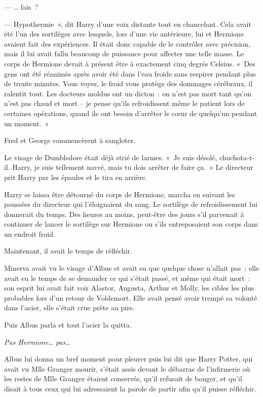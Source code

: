 --- … fais~?

--- Hypothermie~», dit Harry d'une voix distante tout en chancelant. Cela avait été l'un des sortilèges avec lesquels, lors d'une vie antérieure, lui et Hermione avaient fait des expériences. Il était donc capable de le contrôler avec précision, mais il lui avait fallu beaucoup de puissance pour affecter une telle masse. Le corps de Hermione devait à présent être à exactement cinq degrés Celsius. «~Des gens ont été réanimés après avoir été dans l'eau froide sans respirer pendant plus de trente minutes. Vous voyez, le froid vous protège des dommages cérébraux, il ralentit tout. Les docteurs moldus ont un dicton~: on n'est pas mort tant qu'on n'est pas chaud et mort -- je pense qu'ils refroidissent même le patient lors de certaines opérations, quand ils ont besoin d'arrêter le cœur de quelqu'un pendant un moment.~»

Fred et George commencèrent à sangloter.

Le visage de Dumbledore était déjà strié de larmes. «~Je suis désolé, chuchota-t-il. Harry, je suis tellement navré, mais tu dois arrêter de faire ça.~» Le directeur prit Harry par les épaules et le tira en arrière.

Harry se laissa être détourné du corps de Hermione, marcha en suivant les poussées du directeur qui l'éloignaient du sang. Le sortilège de refroidissement lui donnerait du temps. Des heures au moins, peut-être des jours s'il parvenait à continuer de lancer le sortilège sur Hermione ou s'ils entreposaient son corps dans un endroit froid.

Maintenant, il avait le temps de réfléchir.

\later

Minerva avait vu le visage d'Albus et avait su que quelque chose n'allait pas~; elle avait eu le temps de se demander ce qui s'était passé, et même qui était mort~: son esprit lui avait fait voir Alastor, Augusta, Arthur et Molly, les cibles les plus probables lors d'un retour de Voldemort. Elle avait pensé avoir trempé sa volonté dans l'acier, elle s'était crue prête au pire.

Puis Albus parla et tout l'acier la quitta.

\emph{Pas Hermione… pas…}

Albus lui donna un bref moment pour pleurer puis lui dit que Harry Potter, qui avait vu Mlle Granger mourir, s'était assis devant le débarras de l'infirmerie où les restes de Mlle Granger étaient conservés, qu'il refusait de bouger, et qu'il disait à tous ceux qui lui adressaient la parole de partir afin qu'il puisse réfléchir.

